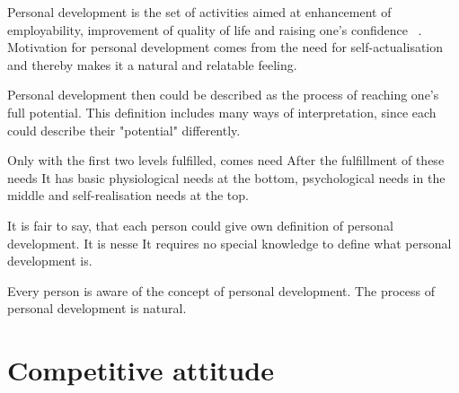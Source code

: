 Personal development is the set of activities aimed at enhancement of employability, improvement of quality of life and raising one's confidence ~\cite{what-is-personal-development}.
Motivation for personal development comes from the need for self-actualisation and thereby makes it a natural and relatable feeling.




Personal development then could be described as the process of reaching one's full potential.
This definition includes many ways of interpretation, since each could describe their "potential" differently.

Only with the first two levels fulfilled, comes need
After the fulfillment of these needs
It has basic physiological needs at the bottom, psychological needs in the middle and self-realisation needs at the top.

It is fair to say, that each person could give own definition of personal development.
It is nesse
It requires no special knowledge to define what personal development is.

Every person is aware of the concept of personal development.
The process of personal development is natural.

\section{Competitive attitude}\label{sec:competitive-attitude}




